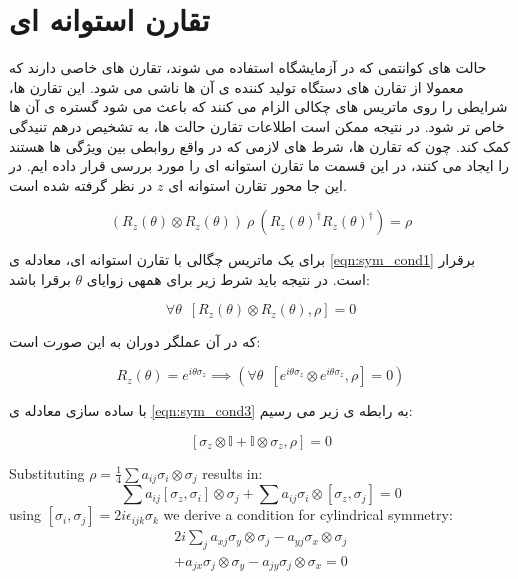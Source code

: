\section{تقارن استوانه ای}

حالت های کوانتمی که در آزمایشگاه استفاده می شوند،‌ تقارن های خاصی دارند که معمولا از تقارن های دستگاه تولید کننده ی آن ها ناشی می شود.
این تقارن ها، شرایطی را روی ماتریس های چکالی الزام می کنند که باعث می شود گستره ی آن ها خاص تر شود. در نتیجه ممکن است اطلاعات تقارن حالت ها، به تشخیص درهم تنیدگی کمک کند.  چون که تقارن ها، شرط های لازمی که در واقع روابطی بین ویژگی ها هستند را ایجاد می کنند، در این قسمت ما تقارن استوانه ای را مورد بررسی قرار داده ایم. در این جا محور تقارن استوانه ای
$z$
در نظر گرفته شده است.

\begin{equation}\label{eqn:sym_cond1}
(R_z(\theta) \otimes R_z(\theta))\> \rho\> (R_z(\theta)^\dag R_z(\theta)^\dag) = \rho
\end{equation}

برای یک ماتریس چگالی با تقارن استوانه ای، معادله ی
\ref{eqn:sym_cond1}
برقرار است. در نتیجه باید شرط زیر برای همهی زوایای
$\theta$
برقرا باشد:

\begin{equation}\label{eqn:sym_cond2}
    \forall \theta \enspace [R_z(\theta)\otimes R_z(\theta) , \rho] = 0
\end{equation}

که در آن عملگر دوران به این صورت است:

\begin{equation}\label{eqn:sym_cond3}
R_z(\theta) = e^{i\theta\sigma_z} \implies (\forall \theta \enspace [e^{i\theta\sigma_z}\otimes e^{i\theta\sigma_z} , \rho] = 0)
\end{equation}

با ساده سازی معادله ی
\ref{eqn:sym_cond3}
به رابطه ی زیر می رسیم:

\begin{equation}\label{eqn:sym_cond4}
[\sigma_z\otimes \mathbb{I} + \mathbb{I}\otimes \sigma_z , \rho] = 0
\end{equation}

Substituting $\rho = \frac{1}{4}\sum a_{ij} \sigma_i \otimes \sigma_j$ results in:
\begin{equation}
\sum a_{ij} [\sigma_z,\sigma_i]\otimes \sigma_j + \sum a_{ij} \sigma_i \otimes [\sigma_z,\sigma_j]=0
\end{equation}
using $[\sigma_i,\sigma_j] = 2i\epsilon_{ijk} \sigma_k$ we derive a condition for cylindrical symmetry:
\begin{equation}
\begin{split}
    2i \sum_j a_{xj}\sigma_y\otimes\sigma_j - a_{yj}\sigma_x\otimes\sigma_j \\
    + a_{jx}\sigma_j\otimes\sigma_y - a_{jy} \sigma_j\otimes\sigma_x = 0
\end{split}
\end{equation}

